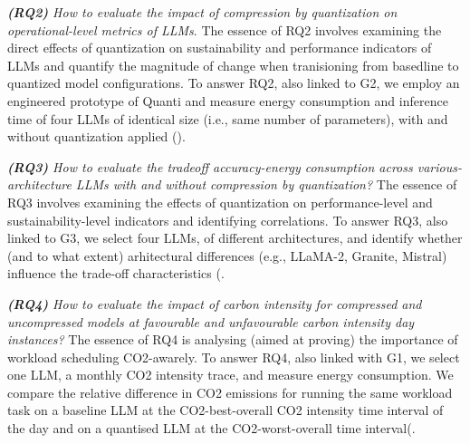 \textit{\textbf{(RQ2)} How to evaluate the impact of compression by quantization on operational-level metrics of LLMs}. The essence of RQ2 involves examining the direct effects of quantization on sustainability and performance indicators of LLMs and quantify the magnitude of change when tranisioning from basedline to quantized model configurations. To answer RQ2, also linked to G2, we employ an engineered prototype of Quanti and measure energy consumption and inference time of four LLMs of identical size (i.e., same number of parameters), with and without quantization applied ().

\textit{\textbf{(RQ3)} How to evaluate the tradeoff accuracy-energy consumption across various-architecture LLMs with and without compression by quantization?} The essence of RQ3 involves examining the effects of quantization on performance-level and sustainability-level indicators and identifying correlations. To answer RQ3, also linked to G3, we select four LLMs, of different architectures, and identify whether (and to what extent) arhitectural differences (e.g., LLaMA-2, Granite, Mistral) influence the trade-off characteristics (.

\textit{\textbf{(RQ4)} How to evaluate the impact of carbon intensity for compressed and uncompressed models at favourable and unfavourable carbon intensity day instances?} The essence of RQ4 is analysing (aimed at proving) the importance of workload scheduling CO2-awarely. To answer RQ4, also linked with G1, we select one LLM, a monthly CO2 intensity trace, and measure energy consumption. We compare the relative difference in CO2 emissions for running the same workload task on a baseline LLM at the CO2-best-overall CO2 intensity time interval of the day and on a quantised LLM at the CO2-worst-overall time interval(.



